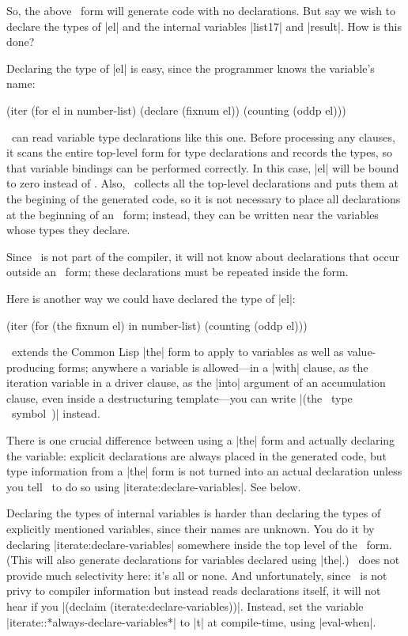 So, the above \iter\ form will generate code with no declarations.
But say we wish to declare the types of |el| and the internal
variables |list17| and |result|.  How is this done?

Declaring the type of |el| is easy, since the programmer knows
the variable's name:
\begin{program}
(iter (for el in number-list)
      (declare (fixnum el))
      (counting (oddp el)))
\end{program}
\iter\ can read variable type declarations like this one.  Before
processing any clauses, it scans the entire top-level form for type
declarations 
and records the types, so that variable bindings can be performed
correctly.  In this case, |el| will be bound to zero
instead of \nil.  Also, \iter\ collects all the top-level declarations
and puts them at the begining of the generated code, so it is not
necessary to place all declarations at the beginning of an \iter\
form; instead, they can be written near the variables whose types they
declare.  

Since \iter\ is not part of the compiler, it will not know
about declarations that occur outside an \iter\ form; these
declarations must be repeated inside the form.

Here is another way we could have declared the type of |el|:
\begin{program}
(iter (for (the fixnum el) in number-list)
      (counting (oddp el)))
\end{program}
\iter\ extends the Common Lisp |the|
form to apply to variables as well as value-producing forms; anywhere
a variable is allowed---in a |with| clause, as the iteration
variable in a driver clause, as the |into| argument of an
accumulation clause, even inside a destructuring template---you can
write |(the ~type~ ~symbol~)| instead.

There is one crucial difference between using a |the| form and
actually declaring the variable: explicit declarations are always
placed in the generated code, but type information from a |the|
form is not turned into an actual declaration unless you tell \iter\
to do so using |iterate:declare-variables|.  See below.

\begin{sloppypar}
Declaring the types of internal variables is harder than declaring the
types of explicitly mentioned variables, since their names
are unknown.  You do it by declaring |iterate:declare-variables|
somewhere inside the top level of the \iter\ form.  (This will also
generate declarations for variables declared using |the|.)
\iter\ does not provide much selectivity here: it's all or none. 
And unfortunately, since \iter\ is not privy to compiler information
but instead reads declarations itself, it will not hear if you
|(declaim (iterate:declare-variables))|.  Instead, set the variable 
|iterate::*always-declare-variables*| to |t| at
compile-time, using |eval-when|.
\end{sloppypar}

